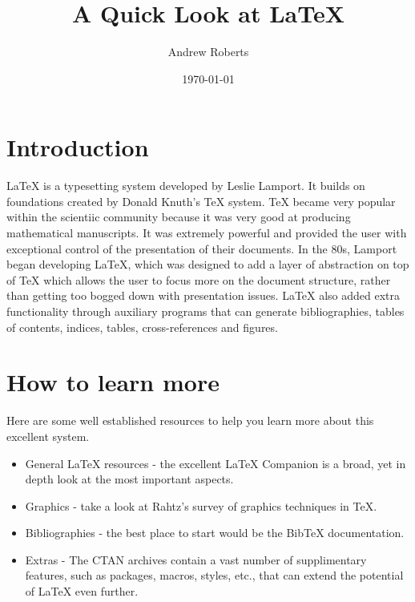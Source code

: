 \documentclass{article}
\newcommand{\BibTeX}{{\sc Bib}\TeX}
\begin{document}
\author{Andrew Roberts}
\title{A Quick Look at \LaTeX}
\date{\today}
\maketitle

\section{Introduction}

\LaTeX{} is a typesetting system developed by Leslie
Lamport\cite{lamport94}.  It builds on foundations created by Donald
Knuth's \TeX{} system\cite{knuth79}.  \TeX{} became very popular within
the scientiic community because it was very good at producing
mathematical manuscripts.  It was extremely powerful and provided the
user with exceptional control of the presentation of their documents.
In the 80s, Lamport began developing \LaTeX, which was designed to add a
layer of abstraction on top of \TeX{} which allows the user to focus
more on the document structure, rather than getting too bogged down with
presentation issues.  \LaTeX{} also added extra functionality through
auxiliary programs that can generate bibliographies, tables of contents,
indices, tables, cross-references and figures.

\section{How to learn more}
Here are some well established resources to help you learn more about
this excellent system.

\begin{itemize}

	\item General \LaTeX{} resources - the excellent \LaTeX{}
Companion\cite{goossens93} is a broad, yet in depth look at the most
important aspects.

	\item Graphics - take a look at Rahtz's\cite{rahtz89} survey of graphics
techniques in \TeX.

	\item Bibliographies - the best place to start would be the
\BibTeX{} documentation\cite{patashnik88}.

	\item Extras - The CTAN archives\cite{greenwade93} contain a vast
number of supplimentary features, such as packages, macros, styles,
etc., that can extend the potential of \LaTeX{} even further.

\end{itemize}



\end{document}
